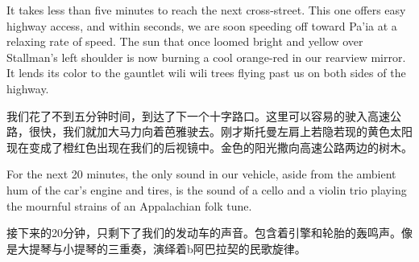 \ifdefined\eng
It takes less than five minutes to reach the next cross-street. This one offers easy highway access, and within seconds, we are soon speeding off toward Pa'ia at a relaxing rate of speed. The sun that once loomed bright and yellow over Stallman's left shoulder is now burning a cool orange-red in our rearview mirror. It lends its color to the gauntlet wili wili trees flying past us on both sides of the highway.
\fi

\ifdefined\chs
我们花了不到五分钟时间，到达了下一个十字路口。这里可以容易的驶入高速公路，很快，我们就加大马力向着芭雅驶去。刚才斯托曼左肩上若隐若现的黄色太阳现在变成了橙红色出现在我们的后视镜中。金色的阳光撒向高速公路两边的树木。
\fi

\ifdefined\eng
For the next 20 minutes, the only sound in our vehicle, aside from the ambient hum of the car's engine and tires, is the sound of a cello and a violin trio playing the mournful strains of an Appalachian folk tune.
\fi

\ifdefined\chs
接下来的20分钟，只剩下了我们的发动车的声音。包含着引擎和轮胎的轰鸣声。像是大提琴与小提琴的三重奏，演绎着b阿巴拉契的民歌旋律。
\fi

\theendnotes
\setcounter{endnote}{0}
